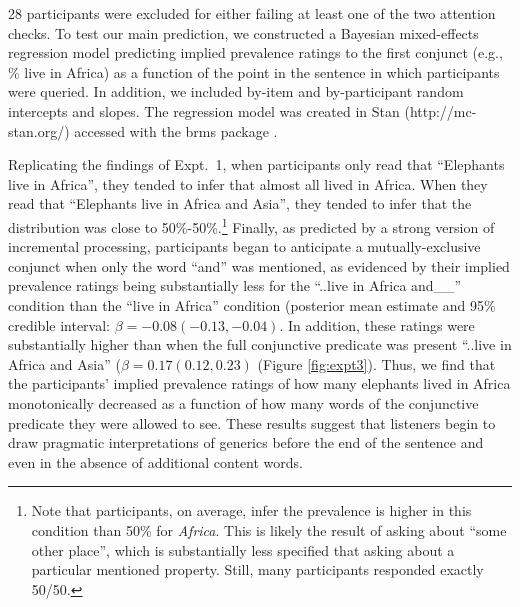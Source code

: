 \documentclass[10pt,letterpaper]{article}
\newcommand{\mh}[1]{{\textcolor{Blue}{[mh: #1]}}}
\begin{document}
% 

28 participants were excluded for either failing at least one of the two attention checks.
To test our main prediction, we constructed a Bayesian mixed-effects regression model predicting implied prevalence ratings to the first conjunct (e.g., \% live in Africa) as a function of the point in the sentence in which participants were queried. 
In addition, we included by-item and by-participant random intercepts and slopes. 
The regression model was created in Stan (http://mc-stan.org/) accessed with the brms package \cite{burkner_brms_2017}.


Replicating the findings of Expt.~1, when participants only read that ``Elephants live in Africa'', they tended to infer that almost all lived in Africa. 
When they read that ``Elephants live in Africa and Asia'', they tended to infer that the distribution was close to 50\%-50\%.\footnote{
Note that participants, on average, infer the prevalence is higher in this condition than 50\% for \emph{Africa}. 
This is likely the result of asking about ``some other place'', which is substantially less specified that asking about a particular mentioned property.  Still, many participants responded exactly 50/50.
}
Finally, as predicted by a strong version of incremental processing, participants began to anticipate a mutually-exclusive conjunct when only the word ``and'' was mentioned, as evidenced by their implied prevalence ratings being substantially less for the ``..live in Africa and\_\_'' condition than the ``live in Africa'' condition (posterior mean estimate and 95\% credible interval: $\beta = -0.08 (-0.13, -0.04)$.
In addition, these ratings were substantially higher than when the full conjunctive predicate was present ``..live in Africa and Asia'' ($\beta = 0.17 (0.12, 0.23)$  (Figure \ref{fig:expt3}).
Thus, we find that the participants' implied prevalence ratings of how many elephants lived in Africa monotonically decreased as a function of how many words of the conjunctive predicate they were allowed to see. 
These results suggest that listeners begin to draw pragmatic interpretations of generics before the end of the sentence and even in the absence of additional content words. 

\end{document}
